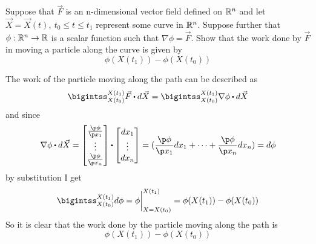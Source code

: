 \documentclass[titlepage]{article}
\begin{document}
\fancyhf{}
\cfoot{\thepage}

\begin{problem}{1}
Suppose that $\vec{F}$ is an n-dimensional vector field defined on $\mathbb{R}^n$ and let $\vec{X} = \vec{X}(t) , \ t_0 \leq t \leq t_1$ represent some curve in $\mathbb{R}^n$. Suppose further that $\phi:\mathbb{R}^n \rightarrow \mathbb{R}$ is a scalar function such that $\nabla\phi = \vec{F}$. Show that the work done by $\vec{F}$ in moving a particle along the curve is given by
$$\phi(X(t_1)) - \phi(X(t_0))$$
\end{problem}

\begin{solution}
The work of the particle moving along the path can be described as
$$ \bigintss_{X(t_0)}^{X(t_1)}\vec{F}\bigcdot d\vec{X} = \bigintss_{X(t_0)}^{X(t_1)}\nabla\phi \bigcdot d\vec{X}$$
and since
$$ \nabla\phi \bigcdot d\vec{X} = \begin{bmatrix}\frac{\p \phi}{\p x_1}\\ \vdots \\ \frac{\p \phi}{\p x_n}\end{bmatrix} \bigcdot \begin{bmatrix}dx_1 \\ \vdots \\ dx_n \end{bmatrix} = (\frac{\p \phi}{\p x_1}dx_1 + \cdots + \frac{\p \phi}{\p x_n}dx_n) = d\phi$$
by substitution I get
$$\bigintss_{X(t_0)}^{X(t_1)}d\phi = \phi\bigg\rvert_{X=X(t_0)}^{X(t_1)} = \phi(X(t_1)) - \phi(X(t_0))$$
So it is clear that the work done by the particle moving along the path is
$$\phi(X(t_1)) - \phi(X(t_0))$$
\end{solution}
\end{document}
